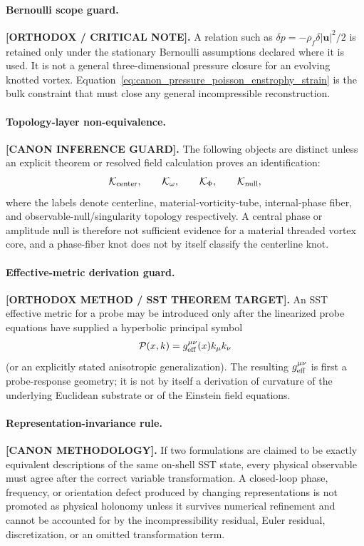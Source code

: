 \paragraph{Bernoulli scope guard.}
\textbf{[ORTHODOX / CRITICAL NOTE].}
A relation such as
\(\delta p=-\rho_{\!f}\delta|\mathbf u|^2/2\) is retained only under the
stationary Bernoulli assumptions declared where it is used.  It is not a
general three-dimensional pressure closure for an evolving knotted vortex.
Equation~\eqref{eq:canon_pressure_poisson_enstrophy_strain} is the bulk
constraint that must close any general incompressible reconstruction.

\paragraph{Topology-layer non-equivalence.}
\textbf{[CANON INFERENCE GUARD].}
The following objects are distinct unless an explicit theorem or resolved
field calculation proves an identification:
\begin{align}
\mathcal K_{\rm center},\qquad
\mathcal K_{\omega},\qquad
\mathcal K_{\Phi},\qquad
\mathcal K_{\rm null},
\end{align}
where the labels denote centerline, material-vorticity-tube, internal-phase
fiber, and observable-null/singularity topology respectively.  A central
phase or amplitude null is therefore not sufficient evidence for a material
threaded vortex core, and a phase-fiber knot does not by itself classify the
centerline knot.

\paragraph{Effective-metric derivation guard.}
\textbf{[ORTHODOX METHOD / SST THEOREM TARGET].}
An SST effective metric for a probe may be introduced only after the
linearized probe equations have supplied a hyperbolic principal symbol
\begin{align}
\mathcal P(x,k)=g_{\rm eff}^{\mu\nu}(x)k_\mu k_\nu
\end{align}
(or an explicitly stated anisotropic generalization).  The resulting
\(g_{\rm eff}^{\mu\nu}\) is first a probe-response geometry; it is not by
itself a derivation of curvature of the underlying Euclidean substrate or of
the Einstein field equations.

\paragraph{Representation-invariance rule.}
\textbf{[CANON METHODOLOGY].}
If two formulations are claimed to be exactly equivalent descriptions of
the same on-shell SST state, every physical observable must agree after the
correct variable transformation.  A closed-loop phase, frequency, or
orientation defect produced by changing representations is not promoted as
physical holonomy unless it survives numerical refinement and cannot be
accounted for by the incompressibility residual, Euler residual, discretization,
or an omitted transformation term.

